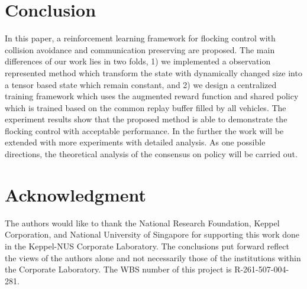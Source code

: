 \documentclass[letterpaper,10 pt,conference]{ieeeconf}
\begin{document}
\section{Conclusion}
In this paper, a reinforcement learning framework for flocking control with collision avoidance and communication preserving are proposed. The main differences of our work lies in two folds, 1) we implemented a observation represented method which transform the state with dynamically changed size into a tensor based state which remain constant, and 2) we design a centralized training framework which uses the augmented reward function and shared policy which is trained based on the common replay buffer filled by all vehicles. The experiment results show that the proposed method is able to demonstrate the flocking control with acceptable performance.
In the further the work will be extended with more experiments with detailed analysis. As one possible directions, the theoretical analysis of the consensus on policy will be carried out.
\section*{Acknowledgment}
The authors would like to thank the National Research Foundation, Keppel Corporation, and National University of
Singapore for supporting this work done in the Keppel-NUS Corporate Laboratory. The conclusions put forward reflect the
views of the authors alone and not necessarily those of the institutions within the Corporate Laboratory. The WBS number
of this project is R-261-507-004-281.


\end{document}
